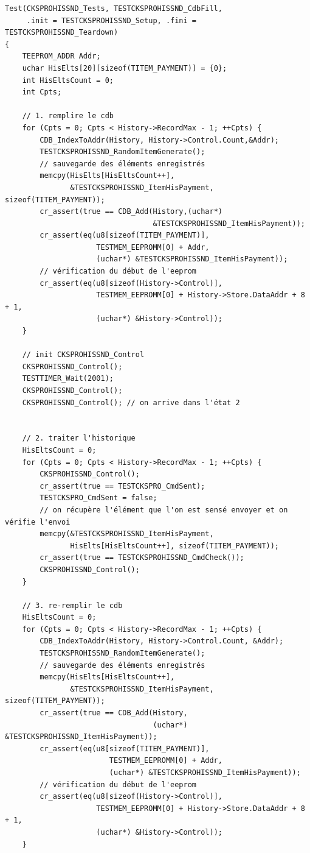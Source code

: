 \documentclass[a4paper]{article}
\begin{document}
\begin{verbatim}
Test(CKSPROHISSND_Tests, TESTCKSPROHISSND_CdbFill,
     .init = TESTCKSPROHISSND_Setup, .fini = TESTCKSPROHISSND_Teardown)
{
    TEEPROM_ADDR Addr;
    uchar HisElts[20][sizeof(TITEM_PAYMENT)] = {0};
    int HisEltsCount = 0;
    int Cpts;

    // 1. remplire le cdb
    for (Cpts = 0; Cpts < History->RecordMax - 1; ++Cpts) {
        CDB_IndexToAddr(History, History->Control.Count,&Addr);
        TESTCKSPROHISSND_RandomItemGenerate();
        // sauvegarde des éléments enregistrés
        memcpy(HisElts[HisEltsCount++],
               &TESTCKSPROHISSND_ItemHisPayment, sizeof(TITEM_PAYMENT));
        cr_assert(true == CDB_Add(History,(uchar*)
                                  &TESTCKSPROHISSND_ItemHisPayment));
        cr_assert(eq(u8[sizeof(TITEM_PAYMENT)],
                     TESTMEM_EEPROMM[0] + Addr,
                     (uchar*) &TESTCKSPROHISSND_ItemHisPayment));
        // vérification du début de l'eeprom
        cr_assert(eq(u8[sizeof(History->Control)],
                     TESTMEM_EEPROMM[0] + History->Store.DataAddr + 8 + 1,
                     (uchar*) &History->Control));
    }

    // init CKSPROHISSND_Control
    CKSPROHISSND_Control();
    TESTTIMER_Wait(2001);
    CKSPROHISSND_Control();
    CKSPROHISSND_Control(); // on arrive dans l'état 2


    // 2. traiter l'historique
    HisEltsCount = 0;
    for (Cpts = 0; Cpts < History->RecordMax - 1; ++Cpts) {
        CKSPROHISSND_Control();
        cr_assert(true == TESTCKSPRO_CmdSent);
        TESTCKSPRO_CmdSent = false;
        // on récupère l'élément que l'on est sensé envoyer et on vérifie l'envoi
        memcpy(&TESTCKSPROHISSND_ItemHisPayment,
               HisElts[HisEltsCount++], sizeof(TITEM_PAYMENT));
        cr_assert(true == TESTCKSPROHISSND_CmdCheck());
        CKSPROHISSND_Control();
    }

    // 3. re-remplir le cdb
    HisEltsCount = 0;
    for (Cpts = 0; Cpts < History->RecordMax - 1; ++Cpts) {
        CDB_IndexToAddr(History, History->Control.Count, &Addr);
        TESTCKSPROHISSND_RandomItemGenerate();
        // sauvegarde des éléments enregistrés
        memcpy(HisElts[HisEltsCount++],
               &TESTCKSPROHISSND_ItemHisPayment, sizeof(TITEM_PAYMENT));
        cr_assert(true == CDB_Add(History,
                                  (uchar*) &TESTCKSPROHISSND_ItemHisPayment));
        cr_assert(eq(u8[sizeof(TITEM_PAYMENT)],
                        TESTMEM_EEPROMM[0] + Addr,
                        (uchar*) &TESTCKSPROHISSND_ItemHisPayment));
        // vérification du début de l'eeprom
        cr_assert(eq(u8[sizeof(History->Control)],
                     TESTMEM_EEPROMM[0] + History->Store.DataAddr + 8 + 1,
                     (uchar*) &History->Control));
    }


\end{verbatim}
\end{document}
